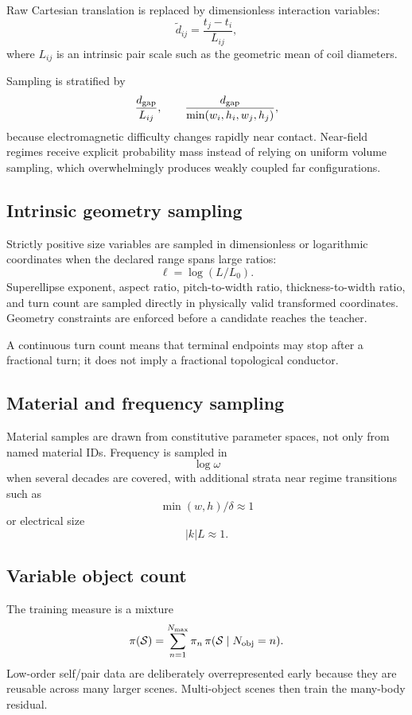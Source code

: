 Raw Cartesian translation is replaced by dimensionless interaction variables:
\[
  \widetilde d_{ij}=\frac{t_j-t_i}{L_{ij}},
\]
where $L_{ij}$ is an intrinsic pair scale such as the geometric mean of coil
diameters.

Sampling is stratified by
\[
  \frac{d_{\rm gap}}{L_{ij}},
  \qquad
  \frac{d_{\rm gap}}{\min(w_i,h_i,w_j,h_j)},
\]
because electromagnetic difficulty changes rapidly near contact. Near-field
regimes receive explicit probability mass instead of relying on uniform volume
sampling, which overwhelmingly produces weakly coupled far configurations.

\subsection{Intrinsic geometry sampling}

Strictly positive size variables are sampled in dimensionless or logarithmic
coordinates when the declared range spans large ratios:
\[
  \ell=\log(L/L_0).
\]
Superellipse exponent, aspect ratio, pitch-to-width ratio,
thickness-to-width ratio, and turn count are sampled directly in physically
valid transformed coordinates. Geometry constraints are enforced before a
candidate reaches the teacher.

A continuous turn count means that terminal endpoints may stop after a
fractional turn; it does not imply a fractional topological conductor.

\subsection{Material and frequency sampling}

Material samples are drawn from constitutive parameter spaces, not only from
named material IDs. Frequency is sampled in
\[
  \log\omega
\]
when several decades are covered, with additional strata near regime
transitions such as
\[
  \min(w,h)/\delta\approx1
\]
or electrical size
\[
  |k|L\approx1.
\]

\subsection{Variable object count}

The training measure is a mixture
\[
  \pi(\mathcal S)
  =
  \sum_{n=1}^{N_{\max}}
  \pi_n\,\pi(\mathcal S\mid N_{\rm obj}=n).
\]
Low-order self/pair data are deliberately overrepresented early because they
are reusable across many larger scenes. Multi-object scenes then train the
many-body residual.

